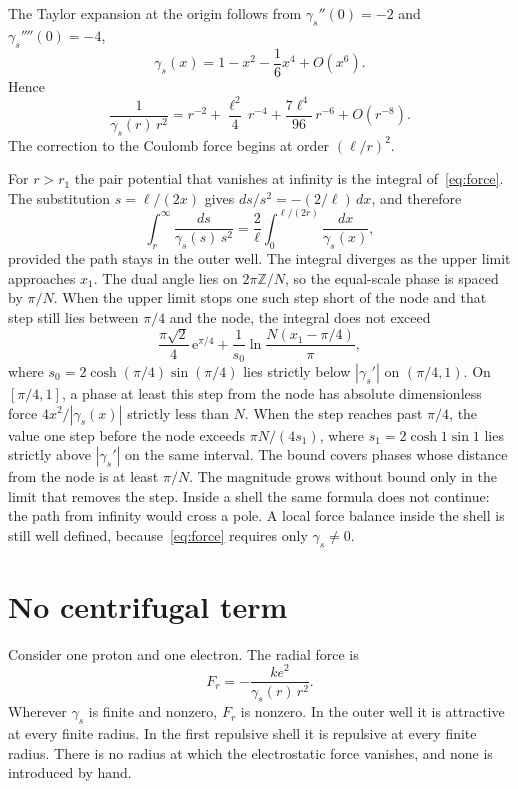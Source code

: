 \documentclass[a4paper]{article}
\begin{document}
The Taylor expansion at the origin follows from \(\gamma_s''(0)=-2\) and \(\gamma_s''''(0)=-4\),
\begin{equation}
\label{eq:series}
\gamma_s(x)=1-x^{2}-\frac16 x^{4}+O(x^{6}).
\end{equation}
Hence
\[
\frac{1}{\gamma_s(r)\,r^{2}}
  =r^{-2}+\frac{\ell^{2}}{4}\,r^{-4}+\frac{7\ell^{4}}{96}\,r^{-6}+O(r^{-8}).
\]
The correction to the Coulomb force begins at order \((\ell/r)^{2}\).

For \(r>r_1\) the pair potential that vanishes at infinity is the integral of~\eqref{eq:force}. The substitution \(s=\ell/(2x)\) gives \(ds/s^{2}=-(2/\ell)\,dx\), and therefore
\begin{equation}
\label{eq:potential}
\int_r^{\infty}\frac{ds}{\gamma_s(s)\,s^{2}}
  =\frac{2}{\ell}\int_0^{\ell/(2r)}\frac{dx}{\gamma_s(x)},
\end{equation}
provided the path stays in the outer well. The integral diverges as the upper limit approaches \(x_1\). The dual angle lies on \(2\pi\mathbb{Z}/N\), so the equal-scale phase is spaced by \(\pi/N\). When the upper limit stops one such step short of the node and that step still lies between \(\pi/4\) and the node, the integral does not exceed
\[
\frac{\pi\sqrt{2}}{4}\,\mathrm{e}^{\pi/4}
  +\frac{1}{s_0}\ln\frac{N(x_1-\pi/4)}{\pi},
\]
where \(s_0=2\cosh(\pi/4)\sin(\pi/4)\) lies strictly below \(|\gamma_s'|\) on \((\pi/4,1)\). On \([\pi/4,1]\), a phase at least this step from the node has absolute dimensionless force \(4x^{2}/|\gamma_s(x)|\) strictly less than \(N\). When the step reaches past \(\pi/4\), the value one step before the node exceeds \(\pi N/(4s_1)\), where \(s_1=2\cosh 1\sin 1\) lies strictly above \(|\gamma_s'|\) on the same interval. The bound covers phases whose distance from the node is at least \(\pi/N\). The magnitude grows without bound only in the limit that removes the step. Inside a shell the same formula does not continue: the path from infinity would cross a pole. A local force balance inside the shell is still well defined, because~\eqref{eq:force} requires only \(\gamma_s\neq 0\).

\section{No centrifugal term}
\label{sec:nocent}

Consider one proton and one electron. The radial force is
\[
F_r=-\frac{k e^{2}}{\gamma_s(r)\,r^{2}}.
\]
Wherever \(\gamma_s\) is finite and nonzero, \(F_r\) is nonzero. In the outer well it is attractive at every finite radius. In the first repulsive shell it is repulsive at every finite radius. There is no radius at which the electrostatic force vanishes, and none is introduced by hand.
\end{document}
